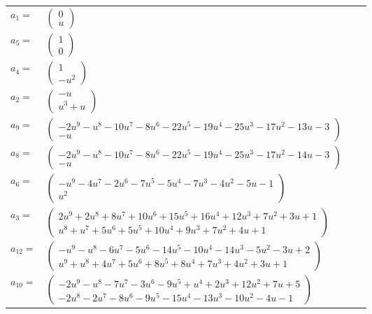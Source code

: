 \documentclass[1p]{elsarticle_modified}
\theoremstyle{definition}
\begin{document}
\begin{tabular}{m{7pt} m{180pt} m{7pt} m{180pt} }
\flushright $a_{1}=$&$\begin{pmatrix}0\\u\end{pmatrix}$ \\
\flushright $a_{5}=$&$\begin{pmatrix}1\\0\end{pmatrix}$ \\
\flushright $a_{4}=$&$\begin{pmatrix}1\\- u^2\end{pmatrix}$ \\
\flushright $a_{2}=$&$\begin{pmatrix}- u\\u^3+u\end{pmatrix}$ \\
\flushright $a_{9}=$&$\begin{pmatrix}-2 u^9- u^8-10 u^7-8 u^6-22 u^5-19 u^4-25 u^3-17 u^2-13 u-3\\- u\end{pmatrix}$ \\
\flushright $a_{8}=$&$\begin{pmatrix}-2 u^9- u^8-10 u^7-8 u^6-22 u^5-19 u^4-25 u^3-17 u^2-14 u-3\\- u\end{pmatrix}$ \\
\flushright $a_{6}=$&$\begin{pmatrix}- u^9-4 u^7-2 u^6-7 u^5-5 u^4-7 u^3-4 u^2-5 u-1\\u^2\end{pmatrix}$ \\
\flushright $a_{3}=$&$\begin{pmatrix}2 u^9+2 u^8+8 u^7+10 u^6+15 u^5+16 u^4+12 u^3+7 u^2+3 u+1\\u^8+u^7+5 u^6+5 u^5+10 u^4+9 u^3+7 u^2+4 u+1\end{pmatrix}$ \\
\flushright $a_{12}=$&$\begin{pmatrix}- u^9- u^8-6 u^7-5 u^6-14 u^5-10 u^4-14 u^3-5 u^2-3 u+2\\u^9+u^8+4 u^7+5 u^6+8 u^5+8 u^4+7 u^3+4 u^2+3 u+1\end{pmatrix}$ \\
\flushright $a_{10}=$&$\begin{pmatrix}-2 u^9- u^8-7 u^7-3 u^6-9 u^5+u^4+2 u^3+12 u^2+7 u+5\\-2 u^8-2 u^7-8 u^6-9 u^5-15 u^4-13 u^3-10 u^2-4 u-1\end{pmatrix}$ \\

\end{tabular}
\end{document}
